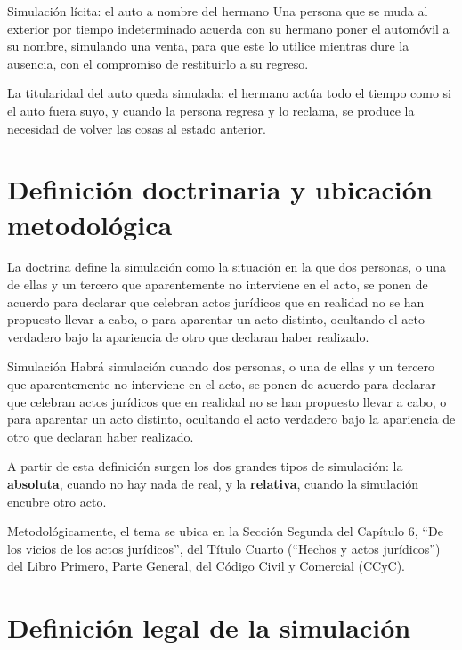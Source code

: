 \documentclass[12pt,oneside]{book}
\begin{document}
\begin{example}{Simulación lícita: el auto a nombre del hermano}
Una persona que se muda al exterior por tiempo indeterminado acuerda con su hermano poner el automóvil a su nombre, simulando una venta, para que este lo utilice mientras dure la ausencia, con el compromiso de restituirlo a su regreso.

La titularidad del auto queda simulada: el hermano actúa todo el tiempo como si el auto fuera suyo, y cuando la persona regresa y lo reclama, se produce la necesidad de volver las cosas al estado anterior.
\end{example}

\section{Definición doctrinaria y ubicación metodológica}

La doctrina define la simulación como la situación en la que dos personas, o una de ellas y un tercero que aparentemente no interviene en el acto, se ponen de acuerdo para declarar que celebran actos jurídicos que en realidad no se han propuesto llevar a cabo, o para aparentar un acto distinto, ocultando el acto verdadero bajo la apariencia de otro que declaran haber realizado.

\begin{definition}{Simulación}
Habrá simulación cuando dos personas, o una de ellas y un tercero que aparentemente no interviene en el acto, se ponen de acuerdo para declarar que celebran actos jurídicos que en realidad no se han propuesto llevar a cabo, o para aparentar un acto distinto, ocultando el acto verdadero bajo la apariencia de otro que declaran haber realizado.
\end{definition}

A partir de esta definición surgen los dos grandes tipos de simulación: la \textbf{absoluta}, cuando no hay nada de real, y la \textbf{relativa}, cuando la simulación encubre otro acto.

Metodológicamente, el tema se ubica en la Sección Segunda del Capítulo 6, ``De los vicios de los actos jurídicos'', del Título Cuarto (``Hechos y actos jurídicos'') del Libro Primero, Parte General, del Código Civil y Comercial (CCyC).

\section{Definición legal de la simulación}
\end{document}
